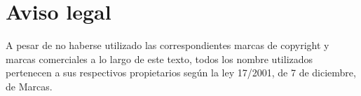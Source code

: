 \chapter{Aviso legal}

A pesar de no haberse utilizado las correspondientes marcas de copyright y marcas comerciales a lo largo de este texto, todos los nombre utilizados pertenecen a sus respectivos propietarios según la ley 17/2001, de 7 de diciembre, de Marcas.